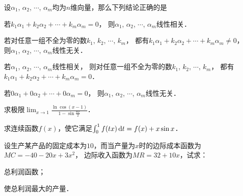 \documentclass[plain,noanswer,medmath]{../../template/jnuexam}
\begin{document}
\begin{problem}
设$\alpha_1$, $\alpha_2$, $\cdots$, $\alpha_m$均为$n$维向量，那么下列结论正确的是\pickout{}
\begin{abcd}
\item 若$k_1\alpha_1 + k_2\alpha_2 + \cdots + k_m \alpha_m = 0$，
      则$\alpha_1$, $\alpha_2$, $\cdots$, $\alpha_m$线性相关．
\item 若对任意一组不全为零的数$k_1$, $k_2$, $\cdots$, $k_m$，
      都有$k_1\alpha_1 + k_2\alpha_2 + \cdots + k_m \alpha_m \ne 0$，
      则$\alpha_1$, $\alpha_2$, $\cdots$, $\alpha_m$线性无关．
\item 若$\alpha_1$, $\alpha_2$, $\cdots$, $\alpha_m$线性相关，
      则对任意一组不全为零的数$k_1$, $k_2$, $\cdots$, $k_m$，
      都有$k_1\alpha_1 + k_2\alpha_2 + \cdots + k_m \alpha_m = 0$．
\item 若$0\alpha_1 + 0\alpha_2 + \cdots + 0\alpha_m = 0$，
      则$\alpha_1$, $\alpha_2$, $\cdots$, $\alpha_m$线性无关．
\end{abcd}
\end{problem}





\begin{problem}
求极限$\lim_{x \to 1} \frac{\ln \cos(x - 1)}{1 - \sin \frac{\pi x}{2}}$．
\end{problem}






\begin{problem}
求连续函数$f(x)$，使它满足$\int_0^1f(tx)\mathop{}\!\mathrm{d} t = f(x) + x\sin x$．
\end{problem}






\begin{problem}
设生产某产品的固定成本为$10$，而当产量为$x$时的边际成本函数为$MC = - 40 - 20x + 3x^2$，
边际收入函数为$MR = 32 + 10x$，试求：\par
\begin{enumerate*}
\item 总利润函数；
\item 使总利润最大的产量．
\end{enumerate*}
\end{problem}
\end{document}
